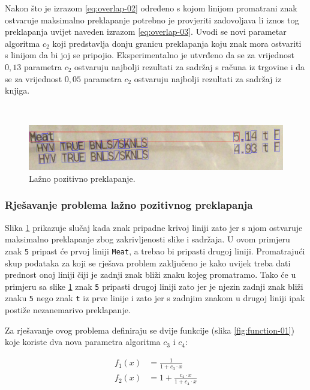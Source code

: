 \documentclass[times, utf8, zavrsni]{fer}
\begin{document}
Nakon što je izrazom \ref{eq:overlap-02} određeno s kojom linijom promatrani
znak ostvaruje maksimalno preklapanje potrebno je provjeriti zadovoljava li
iznos tog preklapanja uvijet naveden izrazom \ref{eq:overlap-03}. Uvodi se novi
parametar algoritma $c_2$ koji predstavlja donju granicu preklapanja koju znak
mora ostvariti s linijom da bi joj se pripojio. Eksperimentalno je utvrđeno da
se za vrijednost $0{,}13$ parametra $c_2$ ostvaruju najbolji rezultati za
sadržaj s računa iz trgovine i da se za vrijednost $0{,}05$ parametra $c_2$
ostvaruju najbolji rezultati za sadržaj iz knjiga.

\

\begin{figure}[htb]
    \centering
    \captionsetup{justification=centering,margin=2cm}
    \includegraphics[width=\textwidth]{images/overlap-02.png}
    \caption{Lažno pozitivno preklapanje.}
    \label{fig:overlap-02}
\end{figure}


\subsubsection{Rješavanje problema lažno pozitivnog preklapanja}
Slika \ref{fig:overlap-02} prikazuje slučaj kada znak pripadne krivoj liniji
zato jer s njom ostvaruje maksimalno preklapanje zbog zakrivljenosti slike i
sadržaja. U ovom primjeru znak \lstinline{5} pripast će prvoj liniji
\lstinline{Meat}, a trebao bi pripasti drugoj liniji. Promatrajući skup
podataka za koji se rješava problem zaključeno je kako uvijek treba dati
prednost onoj liniji čiji je zadnji znak bliži znaku kojeg promatramo. Tako će
u primjeru sa slike \ref{fig:overlap-02} znak \lstinline{5} pripasti drugoj
liniji zato jer je njezin zadnji znak bliži znaku \lstinline{5} nego znak
\lstinline{t} iz prve linije i zato jer s zadnjim znakom u drugoj liniji ipak
postiže nezanemarivo preklapanje.

Za rješavanje ovog problema definiraju se dvije funkcije (slika
\ref{fig:function-01})
koje koriste dva nova parametra algoritma $c_3$ i $c_4$:

\begin{align}
f_1(x) &= \frac{1}{1 + c_3 \cdot x} \\[10pt]
f_2(x) &= 1 + \frac{c_4 \cdot x}{1 + c_4 \cdot x}
\end{align}
\end{document}
